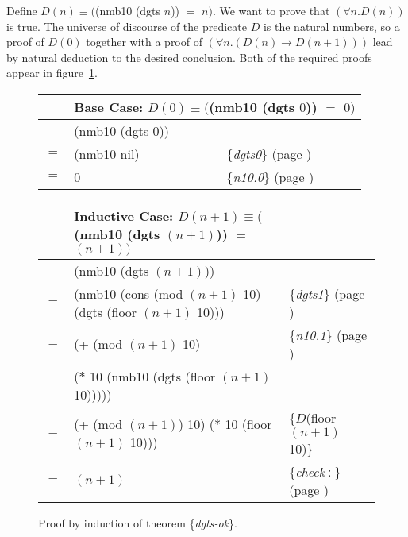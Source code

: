 Define $D(n) \equiv ($\textsf{(nmb10 (dgts $n$))} $=$ $n)$.
We want to prove that $(\forall n.D(n))$ is true.
The universe of discourse
of the predicate $D$ is the natural numbers,
so a proof of $D(0)$
together with a proof of
$(\forall n.(D(n) \rightarrow D(n+1)))$
lead by natural deduction to the desired conclusion.
Both of the required proofs appear in
figure~\ref{fig:horner10-inverse}.

\begin{figure}
\begin{center}
\begin{tabular}{rll}
&\multicolumn{2}{l}{Base Case: $D(0) \equiv ($\textsf{(nmb10 (dgts $0$))} $=$ $0)$}\\
    \hline
    & \textsf{(nmb10 (dgts $0$))} & \\
$=$ & \textsf{(nmb10 nil)}        & \{\emph{dgts0}\} (page \pageref{dgts-defun}) \\
$=$ & \textsf{0}                  & \{\emph{n10.0}\} (page \pageref{nmb10-defun}) \\
\end{tabular}
\end{center}
\begin{center}
\addtolength{\tabcolsep}{-2pt}
\begin{tabular}{rll}
&Inductive Case: $D(n+1) \equiv ($\textsf{(nmb10 (dgts $(n+1)$))} $=$ $(n + 1))$&\\
    \hline
    & \textsf{(nmb10 (dgts $(n+1)$))}           & \\
$=$ & \textsf{(nmb10 (cons (mod $(n+1)$ 10) (dgts (floor $(n+1)$ 10)))}  & \{\emph{dgts1}\} (page \pageref{dgts-defun})\\
$=$ & \textsf{(+ (mod $(n+1)$ 10)}              & \{\emph{n10.1}\} (page \pageref{nmb10-defun})\\
    & \phantom{\textsf{(+ }}\textsf{($*$ 10 (nmb10 (dgts (floor $(n+1)$ 10)))))} &\\
$=$ & \textsf{(+ (mod $(n+1)$) 10) ($*$ 10 (floor $(n+1)$ 10)))}  & \{$D$(floor $(n+1)$ 10)\} \\
$=$ & $(n+1)$  & \{\emph{check}$\div$\} (page \pageref{third-grade-division})
\end{tabular}
\addtolength{\tabcolsep}{2pt}
\end{center}
\caption{Proof by induction of theorem \{\emph{dgts-ok}\}.}
\label{fig:horner10-inverse}
\end{figure}

